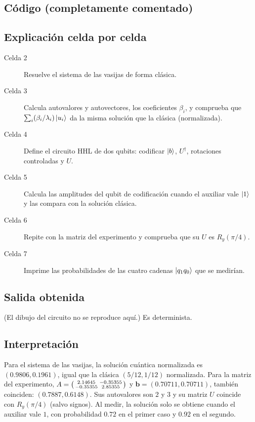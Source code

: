 \subsection{Código (completamente comentado)}


\subsection{Explicación celda por celda}
\begin{description}
  \item[Celda 2] Resuelve el sistema de las vasijas de forma clásica.
  \item[Celda 3] Calcula autovalores y autovectores, los coeficientes
    $\beta_i$, y comprueba que $\sum_i(\beta_i/\lambda_i)\left|u_i\right\rangle$ da la misma
    solución que la clásica (normalizada).
  \item[Celda 4] Define el circuito HHL de dos qubits: codificar $\left|b\right\rangle$,
    $U^\dagger$, rotaciones controladas y $U$.
  \item[Celda 5] Calcula las amplitudes del qubit de codificación cuando el
    auxiliar vale $\left|1\right\rangle$ y las compara con la solución clásica.
  \item[Celda 6] Repite con la matriz del experimento y comprueba que su $U$ es
    $R_y(\pi/4)$.
  \item[Celda 7] Imprime las probabilidades de las cuatro cadenas
    $\left|q_1q_0\right\rangle$ que se medirían.
\end{description}

\subsection{Salida obtenida}

(El dibujo del circuito no se reproduce aquí.) Es determinista.

\subsection{Interpretación}
Para el sistema de las vasijas, la solución cuántica normalizada es
$(0.9806,0.1961)$, igual que la clásica $(5/12,1/12)$ normalizada. Para la
matriz del experimento, $A=\begin{psmallmatrix}2.14645&-0.35355\\-0.35355&2.85355\end{psmallmatrix}$
y $\mathbf b=(0.70711,0.70711)$, también coinciden: $(0.7887,0.6148)$. Sus
autovalores son $2$ y $3$ y su matriz $U$ coincide con $R_y(\pi/4)$ (salvo
signos). Al medir, la solución solo se obtiene cuando el auxiliar vale $1$,
con probabilidad $0.72$ en el primer caso y $0.92$ en el segundo.

